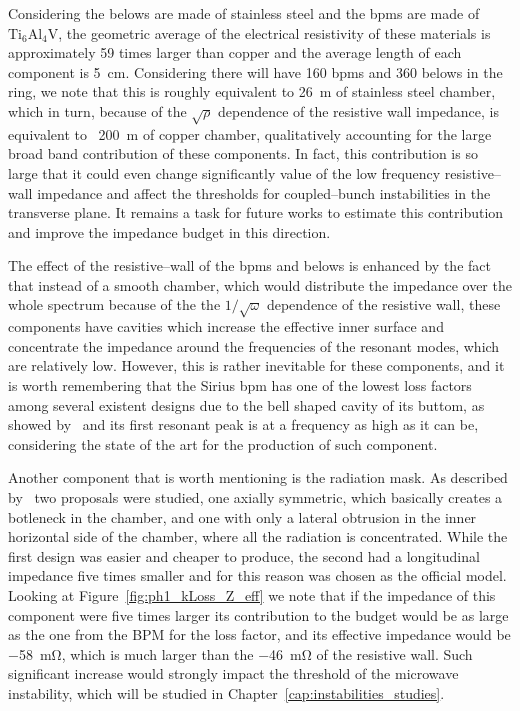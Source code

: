     Considering the belows are made of stainless steel and the \glspl{bpm} are made of $\text{Ti}_\text{6}\text{Al}_\text{4}\text{V}$, the geometric average of the electrical resistivity of these materials is approximately \num{59} times larger than copper and the average length of each component is \SI{5}{\centi\meter}. Considering there will have \num{160} \glspl{bpm} and \num{360} belows in the ring, we note that this is roughly equivalent to \SI{26}{\meter} of stainless steel chamber, which in turn, because of the $\sqrt{\rho}$ dependence of the resistive wall impedance, is equivalent to ~\SI{200}{\meter} of copper chamber, qualitatively accounting for the large broad band contribution of these components. In fact, this contribution is so large that it could even change significantly value of the low frequency resistive--wall impedance and affect the thresholds for coupled--bunch instabilities in the transverse plane. It remains a task for future works to estimate this contribution and improve the impedance budget in this direction.

    The effect of the resistive--wall of the \glspl{bpm} and belows is enhanced by the fact that instead of a smooth chamber, which would distribute the impedance over the whole spectrum because of the the $1/\sqrt{\omega}$ dependence of the resistive wall, these components have cavities which increase the effective inner surface and concentrate the impedance around the frequencies of the resonant modes, which are relatively low. However, this is rather inevitable for these components, and it is worth remembering that the Sirius \gls{bpm} has one of the lowest loss factors among several existent designs due to the bell shaped cavity of its buttom, as showed by~ and its first resonant peak is at a frequency as high as it can be, considering the state of the art for the production of such component.

    Another component that is worth mentioning is the radiation mask. As described by~ two proposals were studied, one axially symmetric, which basically creates a botleneck in the chamber, and one with only a lateral obtrusion in the inner horizontal side of the chamber, where all the radiation is concentrated. While the first design was easier and cheaper to produce, the second had a longitudinal impedance five times smaller and for this reason was chosen as the official model. Looking at Figure~\ref{fig:ph1_kLoss_Z_eff} we note that if the impedance of this component were five times larger its contribution to the budget would be as large as the one from the BPM for the loss factor, and its effective impedance would be \SI{-58}{\milli\ohm}, which is much larger than the \SI{-46}{\milli\ohm} of the resistive wall. Such significant increase would strongly impact the threshold of the microwave instability, which will be studied in Chapter~\ref{cap:instabilities_studies}.

